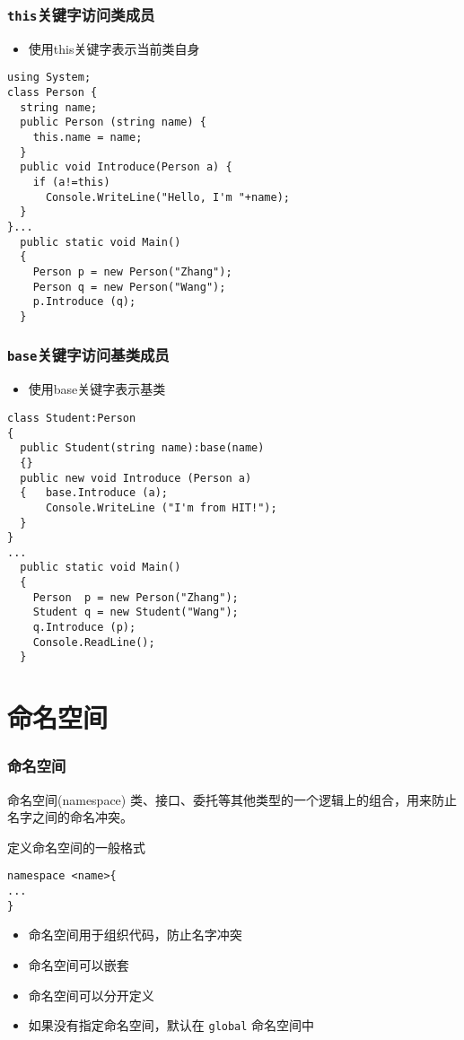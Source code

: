 \begin{frame}[fragile]
\frametitle{\texttt{this}关键字访问类成员}
\begin{itemize}
\item 使用this关键字表示当前类自身
\end{itemize}
\begin{lstlisting}
using System;
class Person {
  string name;
  public Person (string name) {
    this.name = name;
  }
  public void Introduce(Person a) {
    if (a!=this)
      Console.WriteLine("Hello, I'm "+name);
  }
}...
  public static void Main()
  {
    Person p = new Person("Zhang");
    Person q = new Person("Wang");
    p.Introduce (q);
  }
\end{lstlisting}
\end{frame}

\begin{frame}[fragile]
\frametitle{\texttt{base}关键字访问基类成员}
\begin{itemize}
\item 使用base关键字表示基类
\end{itemize}
\begin{lstlisting}
class Student:Person
{
  public Student(string name):base(name)
  {}
  public new void Introduce (Person a)
  {   base.Introduce (a);
      Console.WriteLine ("I'm from HIT!");
  }
}
...
  public static void Main()
  {
    Person  p = new Person("Zhang");
    Student q = new Student("Wang");
    q.Introduce (p);
    Console.ReadLine();
  }
\end{lstlisting}
\end{frame}

\section{命名空间}

\begin{frame}[fragile]
\frametitle{命名空间}
\begin{block}{命名空间(namespace)}
  \CJKindent 类、接口、委托等其他类型的一个逻辑上的组合，用来防止名字之间的命名冲突。
\end{block}
\pause
定义命名空间的一般格式
\begin{lstlisting}
namespace <name>{
...
}
\end{lstlisting}
\begin{itemize}
\item 命名空间用于组织代码，防止名字冲突
\item 命名空间可以嵌套
\item 命名空间可以分开定义
\item 如果没有指定命名空间，默认在 \texttt{global} 命名空间中
\end{itemize}
\end{frame}

